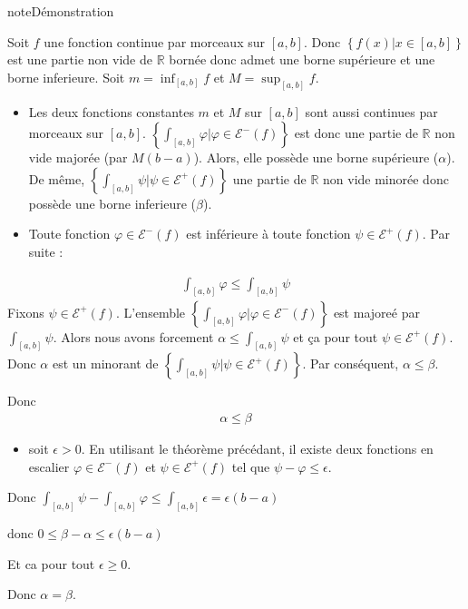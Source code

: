 \documentclass[letterpaper,10pt,french]{jupyterBook}
\begin{document}
\begin{sphinxadmonition}{note}{Démonstration}

\sphinxAtStartPar
Soit \(f\) une fonction continue par morceaux sur \([a, b]\). Donc \(\left\{f(x)|x\in [a, b]\right\}\) est une partie non vide de \(\mathbb R\) bornée donc admet une borne supérieure et une borne inferieure. Soit \(m=\inf_{[a, b]} f\) et \(M=\sup_{[a, b]} f\).
\begin{itemize}
\item {} 
\sphinxAtStartPar
Les deux fonctions constantes \(m\) et \(M\) sur \([a, b]\) sont aussi continues par morceaux sur \([a, b]\). \(\left\{\int_{[a, b]} \varphi | \varphi \in \mathcal{E}^-(f)\right\}\) est donc une partie de \(\mathbb R\) non vide majorée (par \(M(b-a)\)). Alors, elle possède une borne supérieure (\(\alpha\)). De même, \(\left\{\int_{[a, b]} \psi | \psi \in \mathcal{E}^+(f)\right\}\) une partie de \(\mathbb R\) non vide minorée donc possède une borne inferieure (\(\beta\)).

\item {} 
\sphinxAtStartPar
Toute fonction \(\varphi \in \mathcal{E}^-(f)\) est inférieure à toute fonction \(\psi \in \mathcal{E}^+(f)\). Par suite :

\end{itemize}
\begin{equation*}
\begin{split}
\int_{[a, b]} \varphi \leq \int_{[a, b]} \psi
\end{split}
\end{equation*}
\sphinxAtStartPar
Fixons \(\psi \in \mathcal{E}^+(f)\). L’ensemble \(\left\{\int_{[a, b]} \varphi | \varphi \in \mathcal{E}^-(f)\right\}\) est majoreé par \(\int_{[a, b]} \psi\). Alors nous avons forcement \(\alpha \leq \int_{[a, b]} \psi\) et ça pour tout \(\psi \in \mathcal{E}^+(f)\). Donc \(\alpha\) est un minorant de \(\left\{\int_{[a, b]} \psi | \psi \in \mathcal{E}^+(f)\right\}\). Par conséquent, \(\alpha \leq \beta\).

\sphinxAtStartPar
Donc
\begin{equation*}
\begin{split}
\alpha \leq \beta
\end{split}
\end{equation*}\begin{itemize}
\item {} 
\sphinxAtStartPar
soit \(\epsilon >0\). En utilisant le théorème précédant, il existe deux fonctions en escalier \(\varphi \in \mathcal{E}^-(f)\) et \(\psi \in \mathcal{E}^+(f)\)  tel que \(\psi - \varphi \leq \epsilon\).

\end{itemize}

\sphinxAtStartPar
Donc \(\int_{[a, b]} \psi - \int_{[a, b]} \varphi \leq \int_{[a, b]} \epsilon = \epsilon(b-a)\)

\sphinxAtStartPar
donc \(0 \leq \beta - \alpha \leq \epsilon(b-a)\)

\sphinxAtStartPar
Et ca pour tout \(\epsilon \geq 0\).

\sphinxAtStartPar
Donc \(\alpha = \beta\).
\end{sphinxadmonition}
\end{document}
